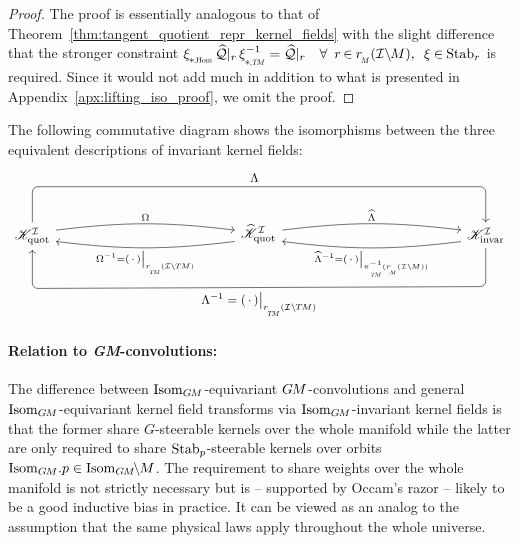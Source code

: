 \begin{proof}
    The proof is essentially analogous to that of Theorem~\ref{thm:tangent_quotient_repr_kernel_fields} with the slight difference that the stronger constraint
    $\dxiHom \Qhat|_r\, \dxiTM^{-1} = \Qhat|_r \quad \forall\,\ r \mkern-2mu\in\mkern-1mu \rM(\IM),\,\ \xi \mkern-1mu\in\mkern-1mu \Stab{r}$
    is required.
    Since it would not add much in addition to what is presented in Appendix~\ref{apx:lifting_iso_proof}, we omit the proof.
\end{proof}

The following commutative diagram shows the isomorphisms between the three equivalent descriptions of invariant kernel fields:
\begin{equation}
    \begin{tikzcd}[row sep=3.5em, column sep=13.em]
        \KIquot
            \arrow[r, bend left=7, shift left=2pt, "\Omega"]
            \arrow[rr, rounded corners, to path={ 
                    -- ([yshift=6.ex]\tikztostart.north) 
                    --node[above, pos=.49]{\small$\Lambda$} ([yshift=6.ex]\tikztotarget.north) 
                    -- (\tikztotarget.north)
                }]
        &
        \KIquothat
            \arrow[r, bend left=7, shift left=2pt, "\widehat{\Lambda}"]
            \arrow[l, bend left=7, shift left=2pt, "\Omega^{-1} = (\,\cdot\,)\big|_{\rTM(\ITM)}"]
        &
        \KIfull
            \arrow[l, bend left=7, shift left=2pt, "\widehat{\Lambda}^{-1} = (\,\cdot\,)\big|_{\piTM^{-1}(\rM(\IM))}"]
            \arrow[ll, rounded corners, to path={ 
                    -- ([yshift=-6.5ex]\tikztostart.south) 
                    --node[below, pos=.5]{\small$\Lambda^{-1} = (\,\cdot\,)\big|_{\rTM(\ITM)}$} ([yshift=-6.5ex]\tikztotarget.south) 
                    -- (\tikztotarget.south)
                }]
    \end{tikzcd}
\end{equation}










\paragraph{Relation to \emph{GM}-convolutions:}

The difference between $\operatorname{Isom}_{G\mkern-1.4muM}$-equivariant $G\mkern-1.4muM$-convolutions and general $\operatorname{Isom}_{G\mkern-1.4muM}$-equivariant kernel field transforms via $\operatorname{Isom}_{G\mkern-1.4muM}$-invariant kernel fields is that the former share $G$-steerable kernels over the whole manifold while the latter are only required to share $\operatorname{Stab}_{p}$-steerable kernels over orbits $\IsomGM\!.p \in \IsomGMM$.
The requirement to share weights over the whole manifold is not strictly necessary but is -- supported by Occam's razor -- likely to be a good inductive bias in practice.
It can be viewed as an analog to the assumption that the same physical laws apply throughout the whole universe.

